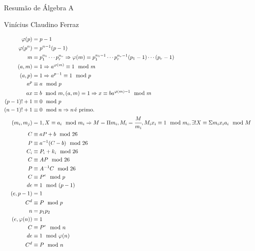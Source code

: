 \documentclass[10pt,a4paper]{article}
\date{}
\begin{document}
	\Large

	\begin{center}
		Resum\~ao de \'Algebra A

		Vin\'icius Claudino Ferraz
	\end{center}

	\normalsize

		\begin{align}
			\varphi(p) &= p - 1 \\
			\varphi(p^n) &= p^{n-1}(p - 1) \\
			m &= p_1^{n_1} \cdots p_r^{n_r} \Rightarrow \varphi(m) = p_1^{n_1 - 1} \cdots p_r^{n_r - 1} (p_1 - 1) \cdots (p_r - 1) \\
			(a, m) &= 1 \Rightarrow a^{\varphi(m)} \equiv 1 \mod m \\
			(a, p) &= 1 \Rightarrow a^{p - 1} \equiv 1 \mod p \\
			a^p &\equiv a \mod p \\
			ax &\equiv b \mod m, (a, m) = 1 \Rightarrow x \equiv ba^{\varphi(m) - 1} \mod m \\
			(p - 1)! + 1 &\equiv 0 \mod p \\
			(n - 1)! + 1 &\equiv 0 \mod n \Rightarrow n \text{\,\'e primo.} \\
			(m_i, m_j) &= 1, X \equiv a_i \mod m_i \Rightarrow M = \Pi m_i, M_i = \cfrac{M}{m_i}, M_i x_i \equiv 1 \mod m_i, \exists ! X \equiv \Sigma m_i x_i a_i \mod M \\
			C &\equiv aP + b \mod 26 \\
			P &\equiv a^{-1} (C - b) \mod 26 \\
			C_i &\equiv P_i + k_i \mod 26 \\
			C &\equiv AP \mod 26 \\
			P &\equiv A^{-1} C \mod 26 \\
			C &\equiv P^e \mod p \\
			de &\equiv 1 \mod (p - 1) \\
			(e, p - 1) &= 1 \\
			C^d &\equiv P \mod p \\
			n &= p_1 p_2 \\
			(e, \varphi(n)) &= 1 \\
			C &\equiv P^e \mod n \\
			de &\equiv 1 \mod \varphi(n) \\
			C^d &\equiv P \mod n
		\end{align}
\end{document}
